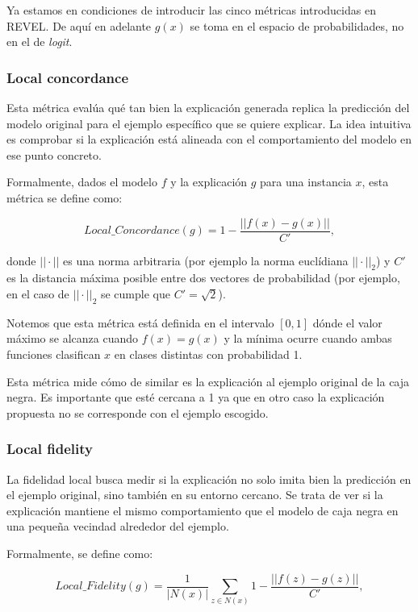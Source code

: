 Ya estamos en condiciones de introducir las cinco métricas introducidas en REVEL. De aquí en adelante $g(x)$ se toma en el espacio de probabilidades, no en el de \textit{logit}.

\subsubsection{Local concordance}

Esta métrica evalúa qué tan bien la explicación generada replica la predicción del modelo original para el ejemplo específico que se quiere explicar. La idea intuitiva es comprobar si la explicación está alineada con el comportamiento del modelo en ese punto concreto.

Formalmente, dados el modelo $f$ y la explicación $g$ para una instancia $x$, esta métrica se define como:

\begin{equation}
Local\_Concordance(g) =  1 - \frac{||f(x)-g(x)||}{C'},
\end{equation}

donde $||\cdot||$ es una norma arbitraria (por ejemplo la norma euclídiana $||\cdot||_2$) y $C'$ es la distancia máxima posible entre dos vectores de probabilidad (por ejemplo, en el caso de $||\cdot||_2$ se cumple que $C'=\sqrt{2}$). 

Notemos que esta métrica está definida en el intervalo $[0,1]$ dónde el valor máximo se alcanza cuando $f(x) = g(x)$ y la mínima ocurre cuando ambas funciones clasifican $x$ en clases distintas con probabilidad 1.

Esta métrica mide cómo de similar es la explicación al ejemplo original de la caja negra. Es importante que esté cercana a 1 ya que en otro caso la explicación propuesta no se corresponde con el ejemplo escogido.

\subsubsection{Local fidelity}

La fidelidad local busca medir si la explicación no solo imita bien la predicción en el ejemplo original, sino también en su entorno cercano. Se trata de ver si la explicación mantiene el mismo comportamiento que el modelo de caja negra en una pequeña vecindad alrededor del ejemplo.

Formalmente, se define como:

\begin{equation}
 Local\_Fidelity(g) =  \frac{1}{|N(x)|} \sum_{z\in N(x)} 1 - \frac{||f(z)-g(z)||}{C'},
\end{equation}

